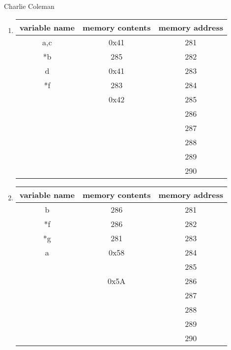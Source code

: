 \documentclass[12pt]{article}
\begin{document}
	
	\hfill Charlie Coleman

	\begin{enumerate}
		\item \begin{tabular}[t]{|c|c|c}
			variable name & memory contents & memory address \\ \hline
			a,c & 0x41 & 281 \\ \hline
			*b & 285 & 282 \\ \hline
			d & 0x41 & 283 \\ \hline
			*f & 283 & 284 \\ \hline
			& 0x42 & 285 \\ \hline
			& & 286 \\ \hline
			& & 287 \\ \hline
			& & 288 \\ \hline
			& & 289 \\ \hline
			& & 290
		\end{tabular}
		\item \begin{tabular}[t]{|c|c|c}
			variable name & memory contents & memory address \\ \hline
			b & 286 & 281 \\ \hline
			*f & 286 & 282 \\ \hline
			*g & 281 & 283 \\ \hline
			a & 0x58 & 284 \\ \hline
			&  & 285 \\ \hline
			& 0x5A & 286 \\ \hline
			&  & 287 \\ \hline
			&  & 288 \\ \hline
			&  & 289 \\ \hline
			&  & 290
		\end{tabular}
	\end{enumerate}
\end{document}
